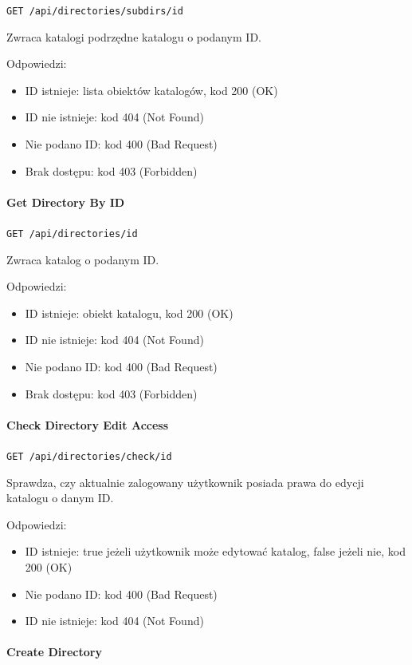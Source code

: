 \documentclass[a4paper,twoside,12pt]{book}
\begin{document}
\texttt{GET /api/directories/subdirs/{id}}

Zwraca katalogi podrzędne katalogu o podanym ID.

Odpowiedzi: 
\begin{itemize}
	\item ID istnieje: lista obiektów katalogów, kod 200 (OK) 
	\item ID nie istnieje: kod 404 (Not Found) 
	\item Nie podano ID: kod 400 (Bad Request)
	\item Brak dostępu: kod 403 (Forbidden)
\end{itemize}

\paragraph{Get Directory By ID}\label{get-directory-by-id}

\texttt{GET /api/directories/{id}}

Zwraca katalog o podanym ID.

Odpowiedzi: 
\begin{itemize}
	\item ID istnieje: obiekt katalogu, kod 200 (OK) 
	\item ID nie istnieje: kod 404 (Not Found) 
	\item Nie podano ID: kod 400 (Bad Request)
	\item Brak dostępu: kod 403 (Forbidden)
\end{itemize}

\paragraph{Check Directory Edit Access}\label{check-directory-edit-access}

\texttt{GET /api/directories/check/{id}}

Sprawdza, czy aktualnie zalogowany użytkownik posiada prawa do edycji katalogu o danym ID.

Odpowiedzi: 
\begin{itemize}
	\item ID istnieje: true jeżeli użytkownik może edytować katalog, false jeżeli nie, kod 200 (OK) 
	\item Nie podano ID: kod 400 (Bad Request) 
	\item ID nie istnieje: kod 404 (Not Found)
\end{itemize}

\paragraph{Create Directory}\label{create-directory}
\end{document}
